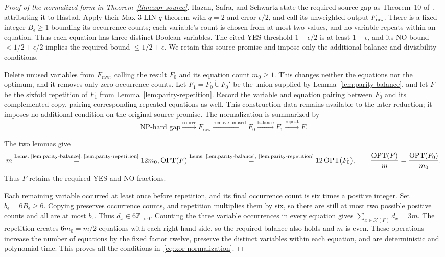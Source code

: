 \begin{proof}[Proof of the normalized form in Theorem~\ref{thm:xor-source}]
Hazan, Safra, and Schwartz state the required source gap as
Theorem~10 of~\cite{HazanSafraSchwartz2003}, attributing it to
H\aa stad. Apply their Max-3-LIN-$q$ theorem with $q=2$ and error
$\epsilon/2$, and call its unweighted output $F_{\mathrm{raw}}$.
There is a fixed integer $B_\epsilon\ge1$ bounding its occurrence
counts; each variable's count is chosen from at most two values,
and no variable repeats within an equation. Thus each equation
has three distinct Boolean variables. The cited YES
threshold $1-\epsilon/2$ is at least $1-\epsilon$, and its NO bound
$<1/2+\epsilon/2$ implies the required bound $\leq1/2+\epsilon$.
We retain this source promise and impose only the additional balance
and divisibility conditions.

Delete unused variables from $F_{\mathrm{raw}}$, calling the result
$F_0$ and its equation count $m_0\ge1$. This changes neither the
equations nor the optimum, and it removes only zero occurrence
counts. Let $F_1=F_0\mathbin{\dot\cup}F_0'$ be the union supplied
by Lemma~\ref{lem:parity-balance}, and let $F$ be the sixfold
repetition of $F_1$ from Lemma~\ref{lem:parity-repetition}.
Record the variable and equation pairing between $F_0$ and its
complemented copy, pairing corresponding repeated equations as well.
This construction data remains available to the later reduction;
it imposes no additional condition on the original source promise.
The normalization is summarized by
\[
 \text{NP-hard gap}
 \xrightarrow{\text{source}}
 F_{\mathrm{raw}}
 \xrightarrow{\text{remove unused}}F_0
 \xrightarrow{\text{balance}}F_1
 \xrightarrow{\text{repeat}}F.
\]

The two lemmas give
\[
m\overset{\text{Lems.~\ref{lem:parity-balance}, \ref{lem:parity-repetition}}}{=}12m_0,
 \operatorname{OPT}(F)\overset{\text{Lems.~\ref{lem:parity-balance}, \ref{lem:parity-repetition}}}{=}12\operatorname{OPT}(F_0),\qquad \frac{\operatorname{OPT}(F)}m=\frac{\operatorname{OPT}(F_0)}{m_0}.
\]
Thus $F$ retains the required YES and NO fractions.

Each remaining variable occurred at least once before repetition,
and its final occurrence count is six times a positive integer.
Set $b_\epsilon=6B_\epsilon\ge6$. Copying preserves occurrence
counts, and repetition multiplies them by six, so there are still
at most two possible positive counts and all are at most
$b_\epsilon$. Thus $d_x\in6\mathbb Z_{>0}$. Counting the three variable
occurrences in every equation gives
$\sum_{x\in\mathcal X(F)}d_x=3m$.
The repetition creates $6m_0=m/2$ equations with each right-hand
side, so the required balance also holds and $m$ is even. These
operations increase the number of equations by the fixed factor
twelve, preserve the distinct variables within each equation, and
are deterministic and polynomial time. This proves all the
conditions in~\eqref{eq:xor-normalization}.
\end{proof}
